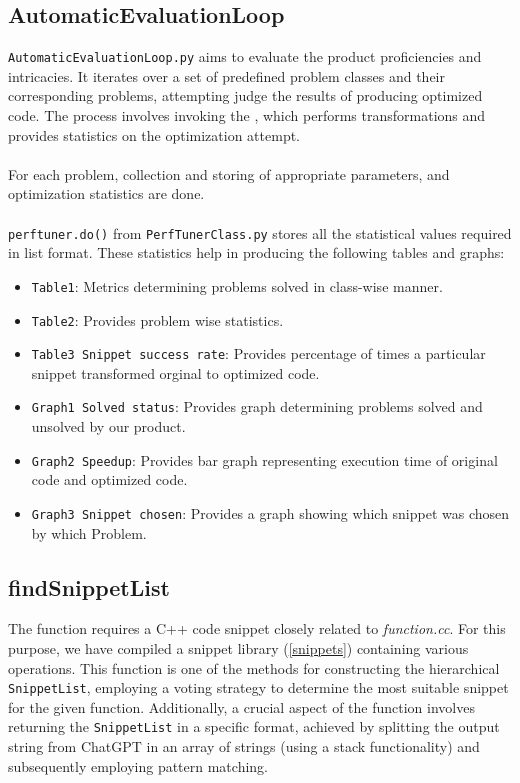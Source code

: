 \documentclass[twocolumn]{article}
\begin{document}
\subsection{AutomaticEvaluationLoop} \label{auto}
\texttt{AutomaticEvaluationLoop.py} aims to evaluate the product proficiencies and intricacies. It iterates over a set of predefined problem classes and their corresponding problems, attempting judge the results of producing optimized code. The process involves invoking the \texttt{} , which performs transformations and provides statistics on the optimization attempt.\\
\\
For each problem, collection and storing of appropriate parameters, and optimization statistics are done.\\
\\
\texttt{perftuner.do()} from \texttt{PerfTunerClass.py} stores all the statistical values required in list format.
These statistics help in producing the following tables and graphs:
\begin{itemize}
    \item \texttt{Table1}: Metrics determining problems solved in class-wise manner.
    \item \texttt{Table2}: Provides problem wise statistics.
    \item \texttt{Table3 Snippet success rate}: Provides percentage of times a particular snippet transformed orginal to optimized code.
    \item \texttt{Graph1 Solved status}: Provides graph determining problems solved and unsolved by our product.
    \item \texttt{Graph2 Speedup}: Provides bar graph representing execution time of original code and optimized code.
    \item \texttt{Graph3 Snippet chosen}: Provides a graph showing which snippet was chosen by which Problem.
\end{itemize}

\subsection{findSnippetList} \label{find}
The function \texttt{} requires a C++ code snippet closely related to \textit{function.cc}. For this purpose, we have compiled a snippet library (\ref{snippets}) containing various operations. This function is one of the methods for constructing the hierarchical \texttt{SnippetList}, employing a voting strategy to determine the most suitable snippet for the given function. Additionally, a crucial aspect of the function involves returning the \texttt{SnippetList} in a specific format, achieved by splitting the output string from ChatGPT in an array of strings (using a stack functionality) and subsequently employing pattern matching.
\end{document}
